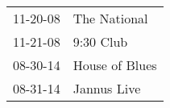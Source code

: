 \begin{supertabular}{p{0.07\textwidth}p{0.23\textwidth}}
 11-20-08 &    The National \\
 11-21-08 &       9:30 Club \\
 08-30-14 &  House of Blues \\
 08-31-14 &     Jannus Live \\
\end{supertabular}
